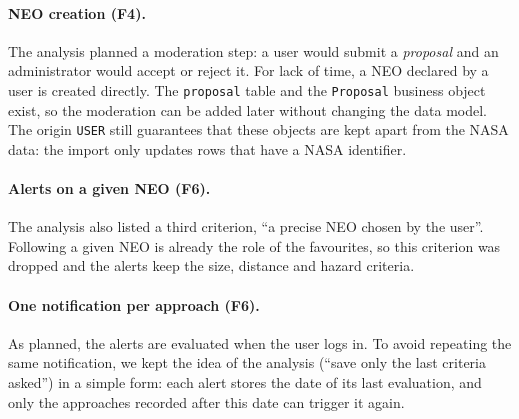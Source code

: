 \paragraph{NEO creation (F4).} The analysis planned a moderation step: a user would submit a
\emph{proposal} and an administrator would accept or reject it. For lack of time, a NEO declared by
a user is created directly. The \texttt{proposal} table and the \texttt{Proposal} business object
exist, so the moderation can be added later without changing the data model. The origin
\texttt{USER} still guarantees that these objects are kept apart from the NASA data: the import
only updates rows that have a NASA identifier.

\paragraph{Alerts on a given NEO (F6).} The analysis also listed a third criterion, ``a precise NEO
chosen by the user''. Following a given NEO is already the role of the favourites, so this
criterion was dropped and the alerts keep the size, distance and hazard criteria.

\paragraph{One notification per approach (F6).} As planned, the alerts are evaluated when the user
logs in. To avoid repeating the same notification, we kept the idea of the analysis (``save only
the last criteria asked'') in a simple form: each alert stores the date of its last evaluation,
and only the approaches recorded after this date can trigger it again.
